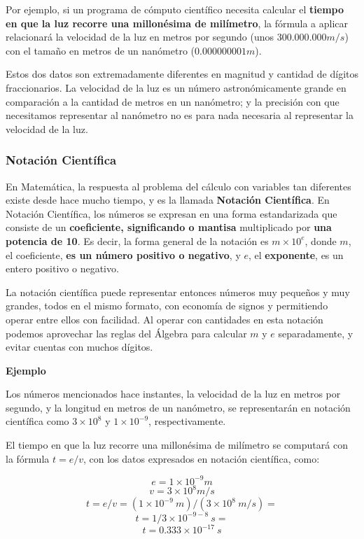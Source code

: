 \documentclass[spanish,A4,]{article}
\begin{document}
Por ejemplo, si un programa de cómputo científico necesita calcular el
\textbf{tiempo en que la luz recorre una millonésima de milímetro}, la
fórmula a aplicar relacionará la velocidad de la luz en metros por
segundo (unos $300.000.000 m/s$) con el tamaño en metros de un nanómetro
($0.000000001 m$).

Estos dos datos son extremadamente diferentes en magnitud y cantidad de
dígitos fraccionarios. La velocidad de la luz es un número
astronómicamente grande en comparación a la cantidad de metros en un
nanómetro; y la precisión con que necesitamos representar al nanómetro
no es para nada necesaria al representar la velocidad de la luz.

\subsubsection{Notación Científica}\label{notaciuxf3n-cientuxedfica}

En Matemática, la respuesta al problema del cálculo con variables tan
diferentes existe desde hace mucho tiempo, y es la llamada
\textbf{Notación Científica}. En Notación Científica, los números se
expresan en una forma estandarizada que consiste de un
\textbf{coeficiente, significando o mantisa} multiplicado por
\textbf{una potencia de 10}. Es decir, la forma general de la notación
es $m \times 10^e$, donde $m$, el coeficiente, \textbf{es un número
positivo o negativo}, y $e$, el \textbf{exponente}, es un entero
positivo o negativo.

La notación científica puede representar entonces números muy pequeños y
muy grandes, todos en el mismo formato, con economía de signos y
permitiendo operar entre ellos con facilidad. Al operar con cantidades
en esta notación podemos aprovechar las reglas del Álgebra para calcular
$m$ y $e$ separadamente, y evitar cuentas con muchos dígitos.

\textbf{Ejemplo}

Los números mencionados hace instantes, la velocidad de la luz en metros
por segundo, y la longitud en metros de un nanómetro, se representarán
en notación científica como $3\times10^8$ y $1\times10^{-9}$,
respectivamente.

El tiempo en que la luz recorre una millonésima de milímetro se
computará con la fórmula $t = e/v$, con los datos expresados en notación
científica, como:

\[e = 1\times10^{-9}m\] \[v = 3\times10^{8}m/s\]
\[t = e / v = (1 \times 10^{-9}\ m) / (3 \times 10^8\ m/s) = \]
\[t = 1 / 3 \times 10^{-9-8}\ s =\] \[t = 0.333 \times 10^{-17}\ s\]
\end{document}
